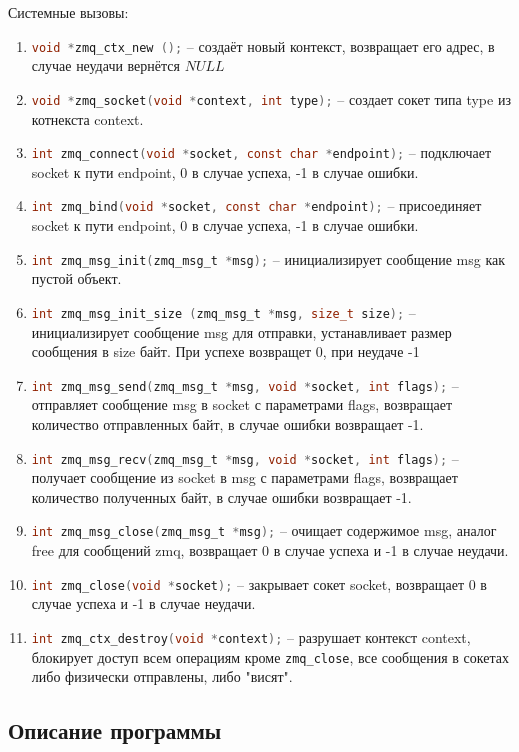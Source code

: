 \documentclass[12pt]{article}
\begin{document}
Системные вызовы:
\begin{enumerate}
    \item \lstinline[language=c]|void *zmq_ctx_new ();| -- создаёт новый контекст, возвращает его адрес, в случае неудачи вернётся $NULL$
    \item \lstinline[language=c]|void *zmq_socket(void *context, int type);| -- создает сокет типа type из котнекста context.
    \item \lstinline[language=c]|int zmq_connect(void *socket, const char *endpoint);| -- подключает socket к пути endpoint, 0 в случае успеха, -1 в случае ошибки.
    \item \lstinline[language=c]|int zmq_bind(void *socket, const char *endpoint);| -- присоединяет socket к пути endpoint, 0 в случае успеха, -1 в случае ошибки.
    \item \lstinline[language=c]|int zmq_msg_init(zmq_msg_t *msg);| -- инициализирует сообщение msg как пустой объект.
    \item \lstinline[language=c]|int zmq_msg_init_size (zmq_msg_t *msg, size_t size);| -- инициализирует сообщение msg для отправки, устанавливает размер сообщения в size байт. При успехе возвращет 0, при неудаче -1
    \item \lstinline[language=c]|int zmq_msg_send(zmq_msg_t *msg, void *socket, int flags);| -- отправляет сообщение msg в socket с параметрами flags, возвращает количество отправленных байт, в случае ошибки возвращает -1.
    \item \lstinline[language=c]|int zmq_msg_recv(zmq_msg_t *msg, void *socket, int flags);| -- получает сообщение из socket в msg с параметрами flags, возвращает количество полученных байт, в случае ошибки возвращает -1.
    \item \lstinline[language=c]|int zmq_msg_close(zmq_msg_t *msg);| -- очищает содержимое msg, аналог free для сообщений zmq, возвращает 0 в случае успеха и -1 в случае неудачи.
    \item \lstinline[language=c]|int zmq_close(void *socket);| -- закрывает сокет socket, возвращает 0 в случае успеха и -1 в случае неудачи.
    \item \lstinline[language=c]|int zmq_ctx_destroy(void *context);| -- разрушает контекст context, блокирует доступ всем операциям кроме \lstinline|zmq_close|, все сообщения в сокетах либо физически отправлены, либо "висят".
\end{enumerate}

\newpage

\subsection*{Описание программы}
\end{document}
